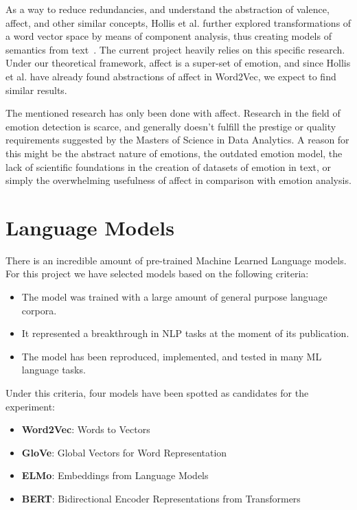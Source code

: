 As a way to reduce redundancies, and understand the abstraction of valence, affect, and other similar concepts, Hollis et al. further explored transformations of a word vector space by means of component analysis, thus creating models of semantics from text~\cite{hollis2016principals}. The current project heavily relies on this specific research. Under our theoretical framework, affect is a super-set of emotion, and since Hollis et al. have already found abstractions of affect in Word2Vec, we expect to find similar results.

The mentioned research has only been done with affect. Research in the field of emotion detection is scarce, and generally doesn't fulfill the prestige or quality requirements suggested by the Masters of Science in Data Analytics. A reason for this might be the abstract nature of emotions, the outdated emotion model, the lack of scientific foundations in the creation of datasets of emotion in text, or simply the overwhelming usefulness of affect in comparison with emotion analysis.


\section{Language Models}\label{sec:Language Models}
There is an incredible amount of pre-trained Machine Learned Language models. For this project we have selected models based on the following criteria:

\begin{itemize}
  \item The model was trained with a large amount of general purpose language corpora.
  \item It represented a breakthrough in NLP tasks at the moment of its publication.
  \item The model has been reproduced, implemented, and tested in many ML language tasks.
\end{itemize}

Under this criteria, four models have been spotted as candidates for the experiment:
\begin{itemize}
  \item \textbf{Word2Vec}: Words to Vectors
  \item \textbf{GloVe}: Global Vectors for Word Representation
  \item \textbf{ELMo}: Embeddings from Language Models
  \item \textbf{BERT}: Bidirectional Encoder Representations from Transformers
\end{itemize}

